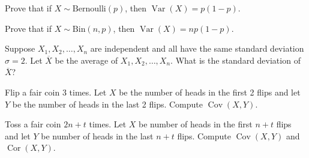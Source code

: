 \documentclass[10pt, a5paper]{scrartcl}
\DeclareMathOperator{\var}{Var}
\DeclareMathOperator{\cov}{Cov}
\DeclareMathOperator{\cor}{Cor}
\begin{document}
\boardquestions

\begin{exercise}[Variances]
  
  \begin{subex}
    Prove that if $X \sim \text{Bernoulli}(p)$, then $\var(X)= p(1-p)$.
  \end{subex}
  
  \begin{subex}
    Prove that if $X \sim \text{Bin}(n, p)$, then $\var(X)= np(1-p)$.
  \end{subex}
  
  \begin{subex}
    Suppose $X_1, X_2, \ldots, X_n$ are independent and all have the same standard
    deviation $\sigma=2$. Let $\overline{X}$ be the average of 
    $X_1, X_2, \ldots, X_n$. What is the standard deviation of $\overline{X}$?
  \end{subex}
\end{exercise}


\begin{exercise}[Covariance]
  Flip a fair coin 3 times. Let $X$ be the number of heads in the first 2 flips
  and let $Y$ be the number of heads in the last 2 flips. Compute $\cov(X,Y)$.
\end{exercise}


\begin{exercise}
  Toss a fair coin $2n+t$ times. Let $X$ be number of heads in the first $n+t$
  flips and let $Y$ be number of heads in the last $n+t$ flips. Compute
  $\cov(X,Y)$ and $\cor(X,Y)$.
\end{exercise}

\vfill\creditsboardquestions
\end{document}
